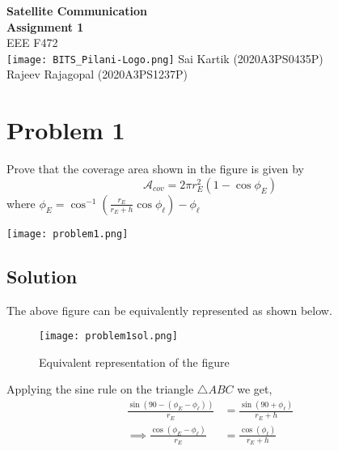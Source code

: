 \documentclass[titlepage]{article}
\begin{document}
\begin{titlepage}
    \begin{center}
        \Huge
        \vspace*{3cm}
        \textbf{ \quad Satellite Communication\\ \quad \quad Assignment 1} \\
        \qquad EEE F472\\[5ex]
        \quad\texttt{[image: BITS\_Pilani-Logo.png]}
        \vfill
        \huge
        \qquad Sai Kartik (2020A3PS0435P)\\\qquad Rajeev Rajagopal (2020A3PS1237P)
    \end{center}
\end{titlepage}


\tableofcontents
\newpage
{}
\setcounter{page}{1}

\section {Problem 1}

\begin{tcolorbox}
    Prove that the coverage area shown in the figure is given by
    $$\mathcal{A}_{cov} = 2\pi r_E^2(1-\cos \phi_E)$$
    where $\phi_E = \cos ^{-1} \left(\frac{r_E}{r_E+h}\cos \phi_{\ell}\right)-\phi_{\ell}$
    \begin{center}
        \texttt{[image: problem1.png]}
    \end{center}
\end{tcolorbox}

\subsection{Solution}

The above figure can be equivalently represented as shown below.
\begin{center}
    \begin{figure}[ht]
        \centering
        \label{fig:problem1}
        \texttt{[image: problem1sol.png]}
        \caption{Equivalent representation of the figure}
    \end{figure}
\end{center}

Applying the sine rule on the triangle $\triangle ABC$ we get,
\begin{align}
    \frac{\sin(90-(\phi_E-\phi_{\ell}))}{r_E}     & = \frac{\sin(90+\phi_{\ell})}{r_E+h}  \label{eq1} \\
    \implies \frac{\cos(\phi_E-\phi_{\ell})}{r_E} & = \frac{\cos(\phi_{\ell})}{r_E+h} \label{eq2}
\end{align}
\end{document}
